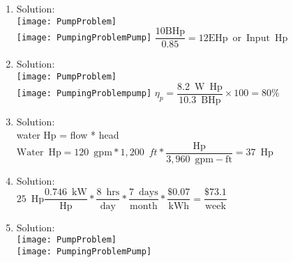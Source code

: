 \begin{enumerate}
 \item Solution:\\
 \vspace{0.4cm}\texttt{[image: PumpProblem]}\\
 \vspace{0.2cm}
 \texttt{[image: PumpingProblemPump]}
 \vspace{0.2cm}
$\dfrac{10 \mathrm{BHp}}{0.85}=\boxed{12 \mathrm{EHp \enspace or \enspace Input \enspace Hp}}$
 \vspace{0.4cm}


  \item Solution:\\ 
  \vspace{0.2cm}
 \vspace{0.08cm}\texttt{[image: PumpProblem]}\\
 \vspace{0.2cm}
 \texttt{[image: PumpingProblempump]}
 \vspace{0.2cm}
$\eta_p=\dfrac{8.2 \mathrm{\enspace W \enspace Hp}}{10.3 \mathrm{\enspace BHp}} \times 100=\boxed{80 \%}$
 \vspace{0.2cm}


\item Solution:\\
\vspace{0.4cm}
water Hp = flow * head\\
\vspace{0.4cm}
$\mathrm{Water} \enspace \mathrm{Hp} = 120 \enspace \mathrm{gpm}*1,200 \enspace ft*\dfrac{\mathrm{Hp}}{3,960 \enspace \mathrm{gpm-ft}}=\boxed{ 37 \enspace \mathrm{Hp}}$\\
\vspace{0.2cm}


\item Solution:\\
\vspace{0.4cm}
$25 \enspace \mathrm{Hp}\dfrac{0.746 \enspace \mathrm{kW}}{\mathrm{Hp}}*\dfrac{8 \enspace \mathrm{hrs}}{\mathrm{day}}*\dfrac{7 \enspace \mathrm{days}}{\mathrm{month}}*\dfrac{\$0.07}{\mathrm{kWh}}=\boxed{\dfrac{\$73.1}{\mathrm{week}}}$\\
\vspace{0.2cm}

 \item Solution:\\
 \vspace{0.4cm}\texttt{[image: PumpProblem]}\\
 \vspace{0.2cm}
 \texttt{[image: PumpingProblemPump]}
 \vspace{0.2cm}


\end{enumerate}
